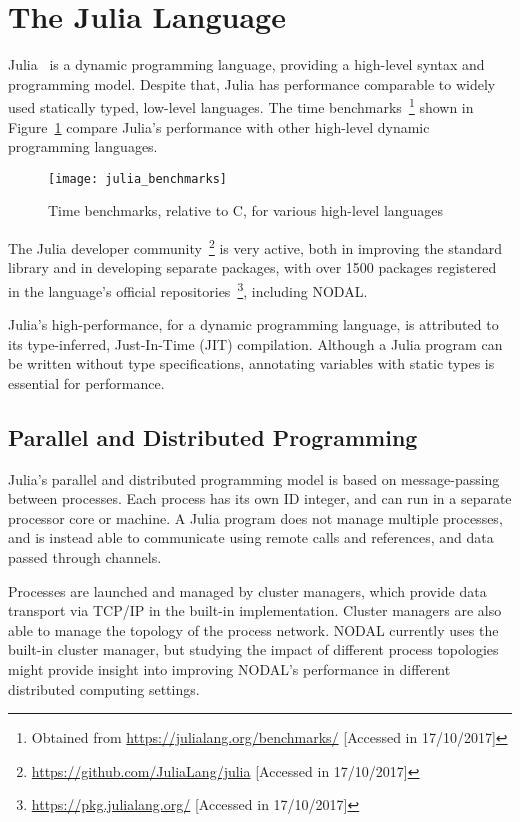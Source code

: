 \section{The Julia Language}
\label{sec:julia}

Julia~\cite{bezanson2012julia,bezanson2014julia} is a dynamic programming
language, providing a high-level syntax and programming model.  Despite that,
Julia has performance comparable to widely used statically typed, low-level
languages. The time benchmarks~\footnote{Obtained from
\url{https://julialang.org/benchmarks/} [Accessed in 17/10/2017]} shown in
Figure~\ref{fig:julia_benchmarks} compare Julia's performance with other
high-level dynamic programming languages.

\begin{figure}[htpb]
    \centering
    \texttt{[image: julia\_benchmarks]}
    \caption{Time benchmarks, relative to C, for various high-level languages}
    \label{fig:julia_benchmarks}
\end{figure}

The Julia developer community~\footnote{\url{https://github.com/JuliaLang/julia} [Accessed in
17/10/2017]} is very active, both in improving the standard library
and in developing separate packages, with over 1500 packages registered
in the language's official
repositories~\footnote{\url{https://pkg.julialang.org/} [Accessed in
17/10/2017]}, including NODAL.

Julia's high-performance, for a dynamic programming language, is attributed to
its type-inferred, Just-In-Time (JIT) compilation. Although a Julia program
can be written without type specifications, annotating variables with static
types is essential for performance.

\subsection{Parallel and Distributed Programming}
\label{sec:parallel-julia}

Julia's parallel and distributed programming model is based on message-passing
between processes. Each process has its own ID integer, and can run in a
separate processor core or machine. A Julia program does not manage multiple
processes, and is instead able to communicate using remote calls and
references, and data passed through channels.

Processes are launched and managed by cluster managers, which provide data
transport via TCP/IP in the built-in implementation. Cluster managers are also
able to manage the topology of the process network. NODAL currently uses the
built-in cluster manager, but studying the impact of different process
topologies might provide insight into improving NODAL's performance in
different distributed computing settings.

